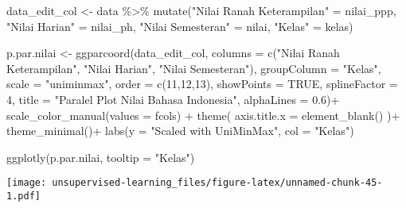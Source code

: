 \documentclass[
]{article}
\newenvironment{Shaded}{\begin{snugshade}}{\end{snugshade}}
\newcommand{\AttributeTok}[1]{\textcolor[rgb]{0.77,0.63,0.00}{#1}}
\newcommand{\ConstantTok}[1]{\textcolor[rgb]{0.00,0.00,0.00}{#1}}
\newcommand{\DecValTok}[1]{\textcolor[rgb]{0.00,0.00,0.81}{#1}}
\newcommand{\FloatTok}[1]{\textcolor[rgb]{0.00,0.00,0.81}{#1}}
\newcommand{\FunctionTok}[1]{\textcolor[rgb]{0.00,0.00,0.00}{#1}}
\newcommand{\NormalTok}[1]{#1}
\newcommand{\OtherTok}[1]{\textcolor[rgb]{0.56,0.35,0.01}{#1}}
\newcommand{\SpecialCharTok}[1]{\textcolor[rgb]{0.00,0.00,0.00}{#1}}
\newcommand{\StringTok}[1]{\textcolor[rgb]{0.31,0.60,0.02}{#1}}
\begin{document}
\begin{Shaded}
\begin{Highlighting}[]
\NormalTok{data\_edit\_col }\OtherTok{\textless{}{-}} 
\NormalTok{  data }\SpecialCharTok{\%\textgreater{}\%} 
  \FunctionTok{mutate}\NormalTok{(}\StringTok{"Nilai Ranah Keterampilan"} \OtherTok{=}\NormalTok{ nilai\_ppp,}
         \StringTok{"Nilai Harian"} \OtherTok{=}\NormalTok{ nilai\_ph,}
         \StringTok{"Nilai Semesteran"} \OtherTok{=}\NormalTok{ nilai,}
         \StringTok{"Kelas"} \OtherTok{=}\NormalTok{ kelas)}

\NormalTok{p.par.nilai }\OtherTok{\textless{}{-}} 
\FunctionTok{ggparcoord}\NormalTok{(data\_edit\_col, }
           \AttributeTok{columns =} \FunctionTok{c}\NormalTok{(}\StringTok{"Nilai Ranah Keterampilan"}\NormalTok{, }
                       \StringTok{"Nilai Harian"}\NormalTok{, }
                       \StringTok{"Nilai Semesteran"}\NormalTok{),}
           \AttributeTok{groupColumn =} \StringTok{"Kelas"}\NormalTok{,}
           \AttributeTok{scale =} \StringTok{"uniminmax"}\NormalTok{,}
           \AttributeTok{order =} \FunctionTok{c}\NormalTok{(}\DecValTok{11}\NormalTok{,}\DecValTok{12}\NormalTok{,}\DecValTok{13}\NormalTok{),}
           \AttributeTok{showPoints =} \ConstantTok{TRUE}\NormalTok{,}
           \AttributeTok{splineFactor =} \DecValTok{4}\NormalTok{,}
           \AttributeTok{title =} \StringTok{"Paralel Plot Nilai Bahasa Indonesia"}\NormalTok{,}
           \AttributeTok{alphaLines =} \FloatTok{0.6}\NormalTok{)}\SpecialCharTok{+} 
  \FunctionTok{scale\_color\_manual}\NormalTok{(}\AttributeTok{values =}\NormalTok{ fcols) }\SpecialCharTok{+}
  \FunctionTok{theme}\NormalTok{(}
    \AttributeTok{axis.title.x =} \FunctionTok{element\_blank}\NormalTok{()}
\NormalTok{  )}\SpecialCharTok{+}
  \FunctionTok{theme\_minimal}\NormalTok{()}\SpecialCharTok{+}
  \FunctionTok{labs}\NormalTok{(}\AttributeTok{y =} \StringTok{"Scaled with UniMinMax"}\NormalTok{,}
       \AttributeTok{col =} \StringTok{"Kelas"}\NormalTok{)}
\end{Highlighting}
\end{Shaded}

\begin{Shaded}
\begin{Highlighting}[]
\FunctionTok{ggplotly}\NormalTok{(p.par.nilai, }\AttributeTok{tooltip =} \StringTok{"Kelas"}\NormalTok{)}
\end{Highlighting}
\end{Shaded}

\texttt{[image: unsupervised-learning\_files/figure-latex/unnamed-chunk-45-1.pdf]}
\end{document}
